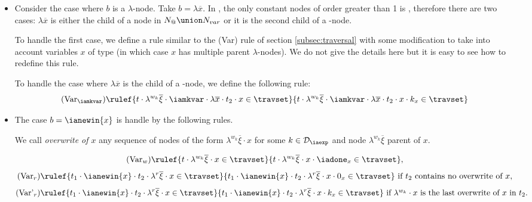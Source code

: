 \begin{itemize}
\begin{itemize}
\item Consider the case where $b$ is a $\lambda$-node. Take $b = \lambda \overline{x}$.
In \ialgol, the only constant nodes of order greater than 1 is \iamkvar,
therefore there are two cases: $\lambda \overline{x}$ is either the child of a node in $N_@ \union N_{var}$
or it is the second child of a \iamkvar-node.

To handle the first case, we define a rule similar to the (Var) rule
of section \ref{subsec:traversal} with some modification to take
into account variables $x$ of type \iavar (in which case $x$ has
multiple parent $\lambda$-nodes). We do not give the details here
but it is easy to see how to redefine this rule.

To handle the case where $\lambda \overline{x}$ is the child of a \iamkvar-node, we define the following rule:
$$ (\mbox{Var}_{\iamkvar})  \rulef{t \cdot \lambda^{w_k} \overline{\xi} \cdot \iamkvar \cdot \lambda \overline{x} \cdot t_2 \cdot x \in \travset}
{t \cdot \lambda^{w_k} \overline{\xi} \cdot \iamkvar \cdot \lambda \overline{x} \cdot t_2 \cdot x \cdot k_{x} \in \travset }
$$

\item The case $b = \ianewin{x}$ is handle by the following rules.

We call \emph{overwrite of $x$} any sequence of nodes of the form $\lambda^{w_k}\overline{\xi} \cdot x$ for some $k\in \mathcal{D}_{\iaexp}$
and node $\lambda^{w_k}\overline{\xi}$ parent of $x$.

$$(\mbox{Var}_w) \rulef{t \cdot \lambda^{w_k} \overline{\xi} \cdot x \in \travset} {t \cdot \lambda^{w_k} \overline{\xi} \cdot x \cdot \iadone_x \in \travset },$$
$$(\mbox{Var}_r) \rulef{t_1 \cdot \ianewin{x} \cdot t_2 \cdot \lambda^r \overline{\xi} \cdot x \in \travset}
                               {t_1 \cdot \ianewin{x} \cdot t_2 \cdot \lambda^r \overline{\xi} \cdot x \cdot 0_x \in \travset }
\mbox{ if $t_2$ contains no overwrite of $x$},$$
$$(\mbox{Var'}_r) \rulef{t_1 \cdot \ianewin{x} \cdot t_2 \cdot \lambda^r \overline{\xi} \cdot x \in \travset}
                               {t_1 \cdot \ianewin{x} \cdot t_2 \cdot \lambda^r \overline{\xi} \cdot x \cdot k_x \in \travset }
\mbox{ if $\lambda^{w_k} \cdot x$ is the last overwrite of $x$ in }
t_2.$$
\end{itemize}
\end{itemize}

